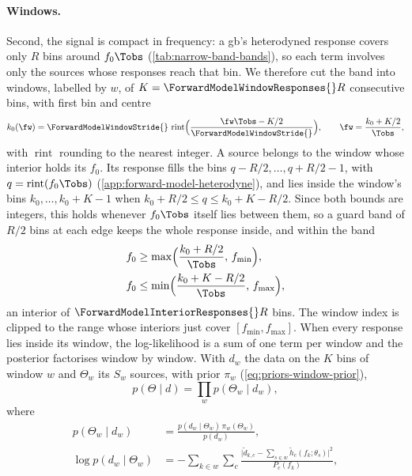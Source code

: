 \paragraph{Windows.}
\label{sec:gw-windows}
Second, the signal is compact in frequency: a \ac{gb}'s heterodyned response covers only $R$ bins
around $f_0\Tobs$ (\cref{tab:narrow-band-bands}), so each term involves only the sources whose
responses reach that bin. We therefore cut the band into windows, labelled by $w$, of
$K = \ForwardModelWindowResponses{}R$ consecutive bins, with first bin and centre
\begin{equation}
  k_0(\fw) = \ForwardModelWindowStride{}\,\operatorname{rint}\Bigl(\frac{\fw\Tobs - K/2}{\ForwardModelWindowStride{}}\Bigr),
  \qquad \fw = \frac{k_0 + K/2}{\Tobs},
  \label{eq:forward-model-window-start}
\end{equation}
with $\operatorname{rint}$ rounding to the nearest integer. A source belongs to the window whose
interior holds its $f_0$. Its response fills the bins $q-R/2,\dots,q+R/2-1$, with
$q=\operatorname{rint}(f_0\Tobs)$ (\cref{app:forward-model-heterodyne}), and lies inside the window's
bins $k_0,\dots,k_0+K-1$ when $k_0+R/2\le q\le k_0+K-R/2$. Since both bounds are integers, this holds
whenever $f_0\Tobs$ itself lies between them, so a guard band of $R/2$ bins at each edge keeps the
whole response inside, and within the band
\begin{equation}
\begin{aligned}
  f_0 &\ge \max\Bigl(\frac{k_0 + R/2}{\Tobs},\, f_{\min}\Bigr),\\
  f_0 &\le \min\Bigl(\frac{k_0 + K - R/2}{\Tobs},\, f_{\max}\Bigr),
\end{aligned}
  \label{eq:forward-model-window-interior}
\end{equation}
an interior of $\ForwardModelInteriorResponses{}R$ bins. The window index is clipped to the range whose
interiors just cover $[f_{\min}, f_{\max}]$. When every response lies inside its window,
the log-likelihood is a sum of one term per window and the posterior factorises window by window.
With $d_w$ the data on the $K$ bins of window $w$ and $\Theta_w$ its $S_w$ sources, with prior
$\pi_w$ (\cref{eq:priors-window-prior}),
\begin{equation}
  p(\Theta\mid d) = \prod_{w} p(\Theta_w\mid d_w),
  \label{eq:gw-factorisation}
\end{equation}
where
\begin{equation}
\begin{aligned}
  p(\Theta_w\mid d_w) &= \frac{p(d_w\mid\Theta_w)\,\pi_w(\Theta_w)}{p(d_w)},\\
  \log p(d_w\mid\Theta_w) &= -\sum_{k\in w}\sum_{c}\frac{\bigl|\tilde d_{k,c}-\sum_{s\in w}\tilde h_c(f_k;\theta_s)\bigr|^2}{P_c(f_k)},
\end{aligned}
  \label{eq:loglik}
\end{equation}
